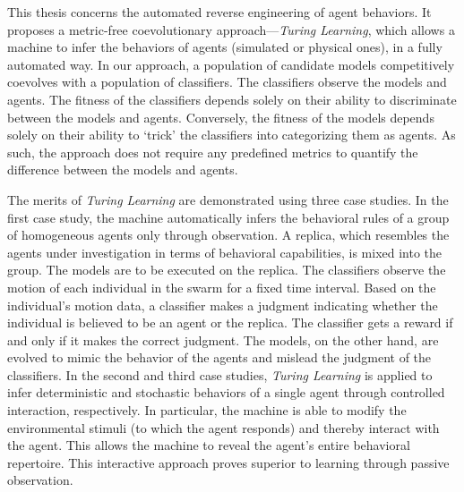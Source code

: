 This thesis concerns the automated reverse engineering of agent behaviors. It proposes a metric-free coevolutionary approach---\textit{Turing Learning}, which allows a machine to infer the behaviors of agents (simulated or physical ones), in a fully automated way. In our approach, a population of candidate models competitively coevolves with a population of classifiers.
The classifiers observe the models and agents. The fitness of the classifiers depends solely on their ability to discriminate between the models and agents. Conversely, the fitness of the models depends solely on their ability to `trick' the classifiers into categorizing them as agents. As such, the approach does not require any predefined metrics to quantify the difference between the models and agents.

The merits of \textit{Turing Learning} are demonstrated using three case studies. In the first case study, the machine automatically infers the behavioral rules of a group of homogeneous agents only through observation. A replica, which resembles the agents under investigation in terms of behavioral capabilities, is mixed into the group. The models are to be executed on the replica. The classifiers observe the motion of each individual in the swarm for a fixed time interval. Based on the individual's motion data, a classifier makes a judgment indicating whether the individual is believed to be an agent or the replica. The classifier gets a reward if and only if it makes the correct judgment. The models, on the other hand, are evolved to mimic the behavior of the agents and mislead the judgment of the classifiers. In the second and third case studies, \textit{Turing Learning} is applied to infer deterministic and stochastic behaviors of a single agent through controlled interaction, respectively. In particular, the machine is able to modify the environmental stimuli (to which the agent responds) and thereby interact with the agent. This allows the machine to reveal the agent's entire behavioral repertoire. This interactive approach proves superior to learning through passive observation. 
